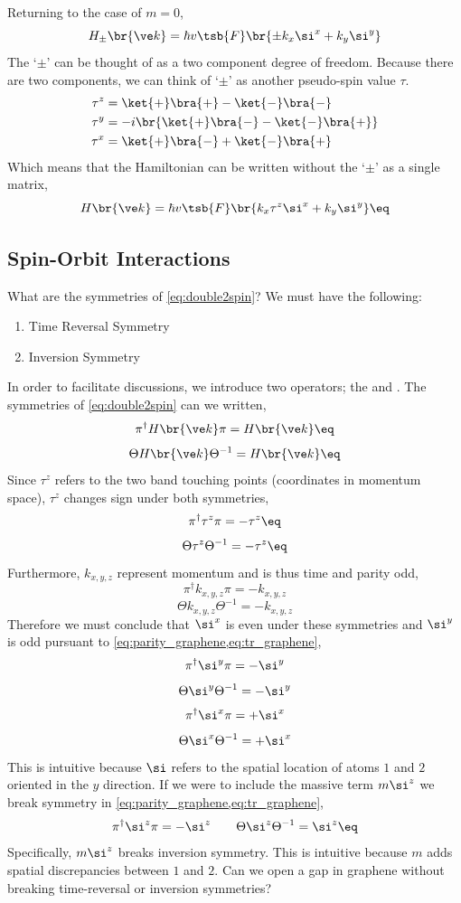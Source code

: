 \documentclass{article}
\begin{document}
Returning to the case of $m=0$,
\[ H_{\pm}\br{\ve k} =\hbar v\tsb{F} \br{\pm k_x \si^x + k_y \si^{y}} \]
The `$\pm$' can be thought of as a two component degree of freedom. Because there are two components, we can think of `$\pm$' as another pseudo-spin value $\tau$.
\begin{align*}
    \tau^{z} &= \ket{+} \bra{+} - \ket{-}\bra{-} \\
    \tau^{y} &= -i\br{\ket{+} \bra{-} - \ket{-}\bra{+}} \\
    \tau^{x} &= \ket{+} \bra{-} + \ket{-}\bra{+}
\end{align*}
Which means that the Hamiltonian can be written without the `$\pm$' as a single matrix,
\[ H\br{\ve k} =\hbar v\tsb{F} \br{k_x \tau^{z} \si^x + k_y \si^{y}} \eq \label{eq:double2spin}\]
\subsection{Spin-Orbit Interactions}
What are the symmetries of \cref{eq:double2spin}? We must have the following:
\begin{enumerate}
    \item Time Reversal Symmetry
    \item Inversion Symmetry
\end{enumerate}
In order to facilitate discussions, we introduce two operators; the  and . The symmetries of \cref{eq:double2spin} can we written,
\[  \pi^{\dagger} H\br{\ve k} \pi = H\br{\ve k} \eq \label{eq:parity_graphene}\]
\[  \Theta H\br{\ve k} \Theta^{-1} = H\br{\ve k} \eq \label{eq:tr_graphene}\]
Since $\tau^{z}$ refers to the two band touching points (coordinates in momentum space), $\tau^{z}$ changes sign under both symmetries,
\[ \pi^{\dagger} \tau^{z} \pi = - \tau^{z} \eq \label{eq:tau_z_sym_parity}\]
\[ \Theta \tau^{z} \Theta^{-1} = - \tau^{z} \eq \label{eq:tau_z_sym_tr}\]
Furthermore, $k_{x, y, z}$ represent momentum and is thus time and parity odd,
\[ \pi^{\dagger} k_{x,y,z} \pi = - k_{x,y,z} \]
\[ \Theta k_{x,y,z} \Theta^{-1} = - k_{x,y,z} \]
Therefore we must conclude that $\si^{x}$ is even under these symmetries and $\si^{y}$ is odd pursuant to \cref{eq:parity_graphene,eq:tr_graphene},
\[ \pi^{\dagger} \si^{y} \pi = - \si^{y} \]
\[ \Theta \si^{y} \Theta^{-1} = - \si^{y} \]
\[ \pi^{\dagger} \si^{x} \pi = + \si^{x} \]
\[ \Theta \si^{x} \Theta^{-1} = + \si^{x} \]
This is intuitive because $\si$ refers to the spatial location of atoms $1$ and $2$ oriented in the $y$ direction.
If we were to include the massive term $m\si^{z}$ we break symmetry in \cref{eq:parity_graphene,eq:tr_graphene},
\[ \pi^{\dagger} \si^{z} \pi = - \si^{z} \qquad \Theta \si^{z} \Theta^{-1} = \si^{z} \eq \label{eq:si_z_sym}\]
Specifically, $m \si^{z}$ breaks inversion symmetry. This is intuitive because $m$ adds spatial discrepancies between $1$ and $2$. Can we open a gap in graphene without breaking time-reversal or inversion symmetries?\\
\end{document}
